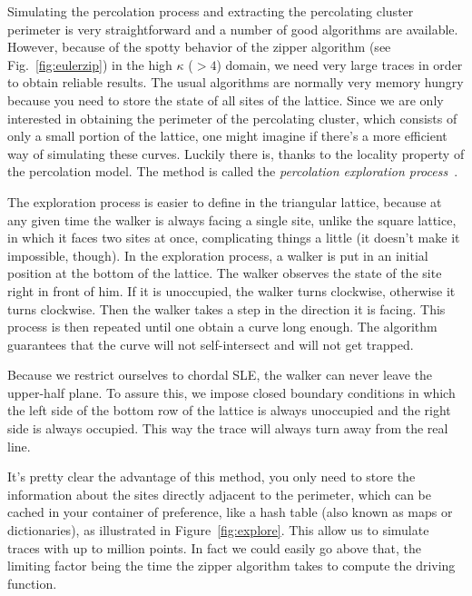 Simulating the percolation process and extracting the percolating cluster
perimeter is very straightforward and a number of good algorithms are
available. However, because of the spotty behavior of the zipper algorithm (see
Fig.~\ref{fig:eulerzip}) in the high $\kappa$ ($>4$) domain, we need very large
traces in order to obtain reliable results. The usual algorithms are normally
very memory hungry because you need to store the state of all sites of the
lattice. Since we are only interested in obtaining the perimeter of the
percolating cluster, which consists of only a small portion of the lattice, one
might imagine if there's a more efficient way of simulating these curves.
Luckily there is, thanks to the locality property of the percolation model. The
method is called the \textit{percolation exploration process}~\cite{Cardy2005}.

The exploration process is easier to define in the triangular lattice, because
at any given time the walker is always facing a single site, unlike the square
lattice, in which it faces two sites at once, complicating things a little (it
doesn't make it impossible, though). In the exploration process, a walker is
put in an initial position at the bottom of the lattice. The walker observes
the state of the site right in front of him. If it is unoccupied, the walker
turns clockwise, otherwise it turns clockwise. Then the walker takes a step in
the direction it is facing. This process is then repeated until one obtain a
curve long enough. The algorithm guarantees that the curve will not
self-intersect and will not get trapped.

Because we restrict ourselves to chordal SLE, the walker can never leave the
upper-half plane. To assure this, we impose closed boundary conditions in which
the left side of the bottom row of the lattice is always unoccupied and the
right side is always occupied. This way the trace will always turn away from
the real line.

It's pretty clear the advantage of this method, you only need to store the
information about the sites directly adjacent to the perimeter, which can be
cached in your container of preference, like a hash table (also known as maps
or dictionaries), as illustrated in Figure~\ref{fig:explore}. This allow us to
simulate traces with up to million points. In fact we could easily go above
that, the limiting factor being the time the zipper algorithm takes to compute
the driving function.

